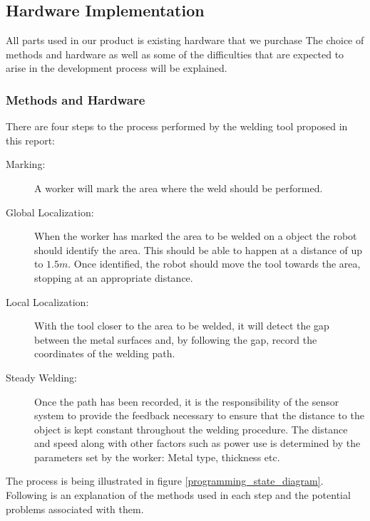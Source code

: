 \subsection{Hardware Implementation}
All parts used in our product is existing hardware that we purchase
The choice of methods and hardware as well as some of the difficulties that are expected to arise in the development process will be explained.
\subsubsection{Methods and Hardware}
There are four steps to the process performed by the welding tool proposed in this report:
\begin{description}
	\item[Marking:            ] A worker will mark the area where the weld should be performed.
	\item[Global Localization:] When the worker has marked the area to be welded on a object the robot should identify the area. This should be able to happen at a distance of up to $1.5m$. Once identified, the robot should move the tool towards the area, stopping at an appropriate distance.
	\item[Local Localization: ] With the tool closer to the area to be welded, it will detect the gap between the metal surfaces and, by following the gap, record the coordinates of the welding path.
	\item[Steady Welding:     ] Once the path has been recorded, it is the responsibility of the sensor system to provide the feedback necessary to ensure that the distance to the object is kept constant throughout the welding procedure. The distance and speed along with other factors such as power use is determined by the parameters set by the worker: Metal type, thickness etc.
\end{description}
The process is being illustrated in figure \ref{programming_state_diagram}. Following is an explanation of the methods used in each step and the potential problems associated with them.

